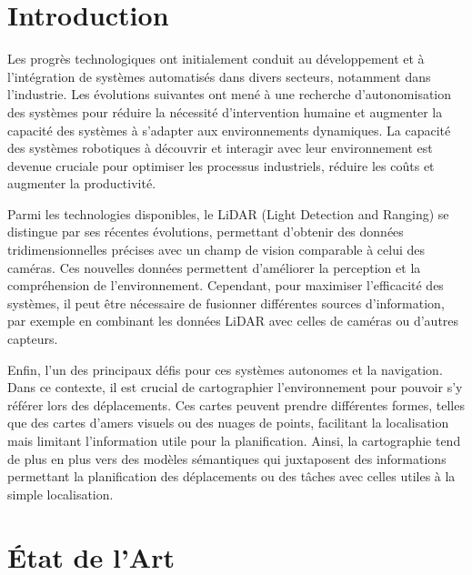 \documentclass[a4paper, french, 10pt, onecolumn, notitlepage, roman]{article}
\begin{document}
\section{Introduction}
Les progrès technologiques ont initialement conduit au développement et à l'intégration de systèmes automatisés dans divers secteurs, notamment dans l'industrie.
Les évolutions suivantes ont mené à une recherche d'autonomisation des systèmes pour réduire la nécessité d'intervention humaine et augmenter la capacité des systèmes à s'adapter aux environnements dynamiques.
La capacité des systèmes robotiques à découvrir et interagir avec leur environnement est devenue cruciale pour optimiser les processus industriels, réduire les coûts et augmenter la productivité.

Parmi les technologies disponibles, le LiDAR (Light Detection and Ranging) se distingue par ses récentes évolutions, permettant d'obtenir des données tridimensionnelles précises avec un champ de vision comparable à celui des caméras.
Ces nouvelles données permettent d'améliorer la perception et la compréhension de l'environnement.
Cependant, pour maximiser l'efficacité des systèmes, il peut être nécessaire de fusionner différentes sources d'information, par exemple en combinant les données LiDAR avec celles de caméras ou d'autres capteurs.

Enfin, l'un des principaux défis pour ces systèmes autonomes et la navigation.
Dans ce contexte, il est crucial de cartographier l'environnement pour pouvoir s'y référer lors des déplacements.
Ces cartes peuvent prendre différentes formes, telles que des cartes d'amers visuels ou des nuages de points, facilitant la localisation mais limitant l'information utile pour la planification.
Ainsi, la cartographie tend de plus en plus vers des modèles sémantiques qui juxtaposent des informations permettant la planification des déplacements ou des tâches avec celles utiles à la simple localisation.

\section{\'Etat de l'Art}
\end{document}
